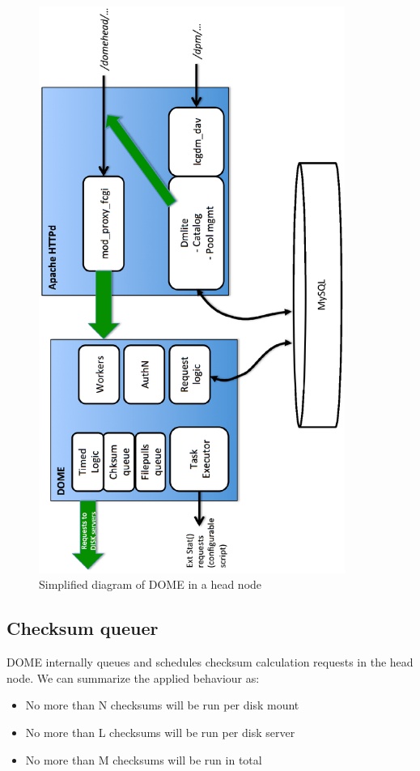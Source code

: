 \documentclass[a4paper]{jpconf}
\begin{document}
\begin{figure}
\begin{center}
 \includegraphics[width=10cm,keepaspectratio=true,angle=-90,origin=c]{./pics/domepics_head.eps}
 \caption{Simplified diagram of DOME in a head node}
 \label{figdomehead}
\end{center}

\end{figure}

\subsection{Checksum queuer}
 DOME internally queues and schedules checksum calculation requests in the head node. We can summarize the applied behaviour as:
 \begin{itemize}
  \item No more than N checksums will be run per disk mount\\
  \item No more than L checksums will be run per disk server\\
  \item No more than M checksums will be run in total\\
 \end{itemize}
 
\end{document}
